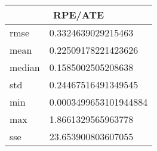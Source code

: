 \begin{table}[!ht] 
 \centering 
 \begin{tabular}{|l|l|} \hline 
 \multicolumn{2}{|c|}{RPE/ATE} \\ \hline 
 rmse & 0.3324639029215463 \\ \hline 
mean & 0.22509178221423626 \\ \hline 
median & 0.1585002505208638 \\ \hline 
std & 0.24467516491349545 \\ \hline 
min & 0.0003499653101944884 \\ \hline 
max & 1.8661329565963778 \\ \hline 
sse & 23.653900803607055 \\ \hline 
\end{tabular} 
 \end{table}